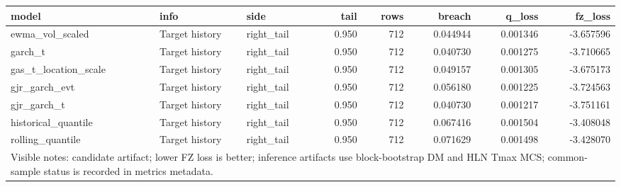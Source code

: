 \begin{tabular}{lllrrrrr}
\toprule
model & info & side & tail & rows & breach & q_loss & fz_loss \\
\midrule
ewma\_vol\_scaled & Target history & right\_tail & 0.950 & 712 & 0.044944 & 0.001346 & -3.657596 \\
garch\_t & Target history & right\_tail & 0.950 & 712 & 0.040730 & 0.001275 & -3.710665 \\
gas\_t\_location\_scale & Target history & right\_tail & 0.950 & 712 & 0.049157 & 0.001305 & -3.675173 \\
gjr\_garch\_evt & Target history & right\_tail & 0.950 & 712 & 0.056180 & 0.001225 & -3.724563 \\
gjr\_garch\_t & Target history & right\_tail & 0.950 & 712 & 0.040730 & 0.001217 & -3.751161 \\
historical\_quantile & Target history & right\_tail & 0.950 & 712 & 0.067416 & 0.001504 & -3.408048 \\
rolling\_quantile & Target history & right\_tail & 0.950 & 712 & 0.071629 & 0.001498 & -3.428070 \\
\midrule
\multicolumn{8}{l}{\footnotesize Visible notes: candidate artifact; lower FZ loss is better; inference artifacts use block-bootstrap DM and HLN Tmax MCS; common-sample status is recorded in metrics metadata.} \\
\bottomrule
\end{tabular}
